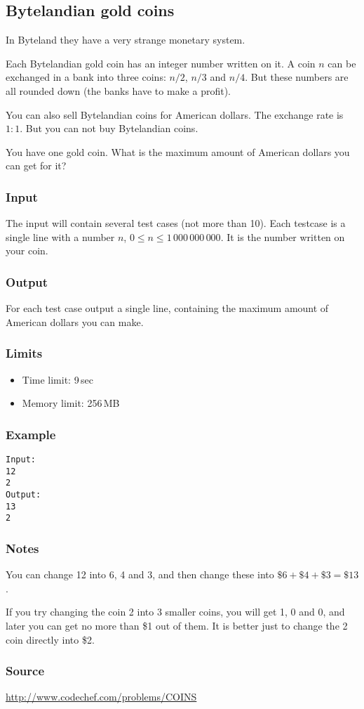 \subsection{Bytelandian gold coins}

In Byteland they have a very strange monetary system.

Each Bytelandian gold coin has an integer number written on it. A coin $n$
can be exchanged in a bank into three coins: $n/2$, $n/3$ and $n/4$.
But these numbers are all rounded down (the banks have to make a profit).

You can also sell Bytelandian coins for American dollars. The exchange
rate is $1:1$. But you can not buy Bytelandian coins.

You have one gold coin. What is the maximum amount of American dollars
you can get for it?

\subsubsection*{Input}
The input will contain several test cases (not more than 10). Each
testcase is a single line with a number $n$, $0 \leq n \leq 1\,000\,000\,000$.
It is the number written on your coin.

\subsubsection*{Output}
For each test case output a single line, containing the maximum amount
of American dollars you can make.

\subsubsection*{Limits}
\begin{itemize}
    \item Time limit: 9\,sec
    \item Memory limit: 256\,MB
\end{itemize}



\subsubsection*{Example}
\begin{verbatim}
Input:
12
2
Output:
13
2
\end{verbatim}

\subsubsection*{Notes}
You can change 12 into 6, 4 and 3, and then change these into
$\$6+\$4+\$3 = \$13$.

If you try changing the coin 2 into 3 smaller coins, you will get
1, 0 and 0, and later you can get no more than \$1 out of them.
It is better just to change the 2 coin directly into \$2.

\subsubsection*{Source} \url{http://www.codechef.com/problems/COINS}
